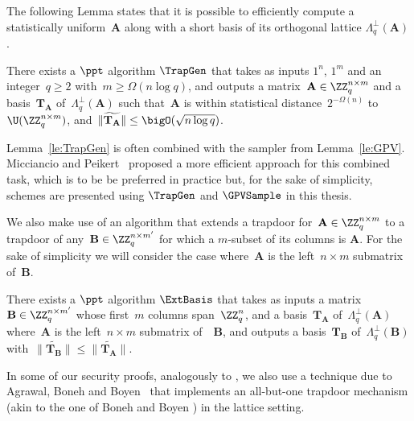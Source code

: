 The following Lemma states that it is possible to efficiently compute a statistically uniform~$\mathbf{A}$ along with a short basis of its orthogonal lattice $\Lambda^{\perp}_q(\mathbf{A})$.


\begin{lemma}[{\cite[Th.~3.2]{AP09}}]
\label{le:TrapGen}
\label{le:GPV}
There exists a $\ppt$ algorithm $\TrapGen$ that takes as inputs $1^n$, $1^m$ and an integer~$q \geq 2$ with~$m \geq \Omega(n \log q)$, and outputs a matrix~$\mathbf{A} \in \ZZ_q^{n \times m}$ and a basis~$\mathbf{T}_{\mathbf{A}}$ of~$\Lambda_q^{\perp}(\mathbf{A})$ such that~$\mathbf{A}$ is within statistical distance~$2^{-\Omega(n)}$ to~$\U(\ZZ_q^{n \times m})$, and~$\|\widetilde{\mathbf{T}_{\mathbf{A}}}\| \leq \bigO(\sqrt{n \log q})$.
\end{lemma}

\noindent Lemma~\ref{le:TrapGen} is often combined with the sampler from Lemma~\ref{le:GPV}. Micciancio and Peikert~\cite{MP12} proposed a more efficient approach for this combined task, which is to be be preferred in practice but, for the sake of simplicity, schemes are presented using $\TrapGen$ and $\GPVSample$ in this thesis.

We also make use of an algorithm that extends a trapdoor for~$\mathbf{A} \in \ZZ_q^{n \times m}$ to a trapdoor of any~$\mathbf{B} \in \ZZ_q^{n \times m'}$ for which a $m$-subset of its columns is $\mathbf{A}$. For the sake of simplicity we will consider the case where~$\mathbf{A}$ is the left~$n \times m$ submatrix of~$\mathbf{B}$.

\begin{lemma}\label{lem:extbasis}
  There exists a $\ppt$ algorithm $\ExtBasis$ that takes as inputs a
  matrix~$\mathbf{B} \in \ZZ_q^{n \times m' }$ whose first~$m$ columns
  span~$\ZZ_q^n$, and a basis~$\mathbf{T}_{\mathbf{A}}$
  of~$\Lambda_q^{\perp}(\mathbf{A})$ where~$\mathbf{A}$ is the left~$n \times
  m$ submatrix of~~$\mathbf{B}$, and outputs a basis~$\mathbf{T}_{\mathbf{B}}$
  of~$\Lambda_q^{\perp}(\mathbf{B})$ with~$\|\widetilde{\mathbf{T}_{\mathbf{B}}}\|
  \leq \|\widetilde{\mathbf{T}_{\mathbf{A}}}\|$.
\end{lemma}

In some of our security proofs, analogously to \cite{Boy10,BHJ+15}, we also use a technique due to Agrawal, Boneh and Boyen~\cite{ABB10} that implements an all-but-one trapdoor mechanism (akin to the one of Boneh and Boyen \cite{BB04}) in the lattice setting.

